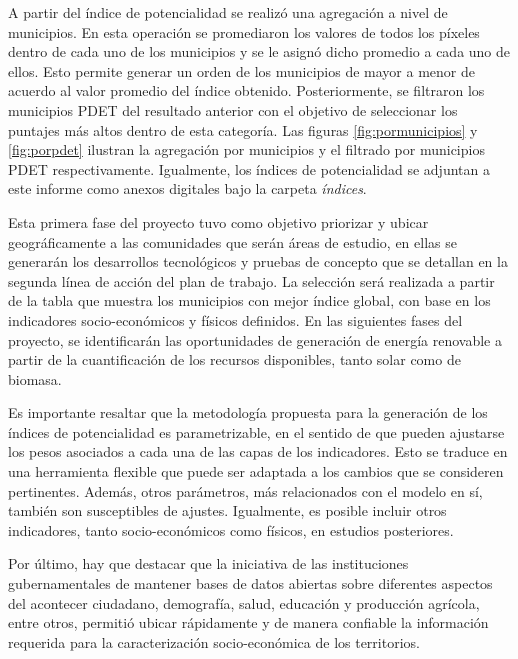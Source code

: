 A partir del índice de potencialidad se realizó una agregación a nivel de municipios.  En esta operación se promediaron los valores de todos los píxeles 
dentro de cada uno de los municipios y se le asignó dicho promedio a cada uno de ellos.  Esto permite generar un orden de los municipios de mayor a menor de 
acuerdo al valor promedio del índice obtenido.  Posteriormente, se filtraron los municipios PDET del resultado anterior con el objetivo de seleccionar los 
puntajes más altos dentro de esta categoría.  Las figuras \ref{fig:pormunicipios} y \ref{fig:porpdet} ilustran la agregación por municipios y el filtrado por 
municipios PDET respectivamente.  Igualmente, los índices de potencialidad se adjuntan a este informe como anexos digitales bajo la carpeta \textit{índices}.

Esta primera fase del proyecto tuvo como objetivo priorizar y ubicar geográficamente a las comunidades que serán áreas de estudio, en ellas se generarán los
desarrollos tecnológicos y pruebas de concepto que se detallan en la segunda línea de acción del plan de trabajo. La selección será realizada a partir de la
tabla que muestra los municipios con mejor índice global, con base en los indicadores socio-económicos y físicos definidos. En las siguientes fases del
proyecto,
se identificarán las oportunidades de generación de energía renovable a partir de la cuantificación de los recursos disponibles, tanto solar como de biomasa.

Es importante resaltar que la metodología propuesta para la generación de los índices de potencialidad es parametrizable, en el sentido de que pueden ajustarse
los pesos asociados a cada una de las capas de los indicadores. Esto se traduce en una herramienta flexible que puede ser adaptada a los cambios que se
consideren pertinentes. Además, otros parámetros, más relacionados con el modelo en sí, también son susceptibles de ajustes. Igualmente, es posible incluir
otros indicadores, tanto socio-económicos como físicos, en estudios posteriores.

Por último, hay que destacar que la iniciativa de las instituciones gubernamentales de mantener bases de datos abiertas sobre diferentes aspectos del acontecer
ciudadano, demografía, salud, educación y producción agrícola, entre otros, permitió ubicar rápidamente y de manera confiable la información requerida para la
caracterización socio-económica de los territorios.

